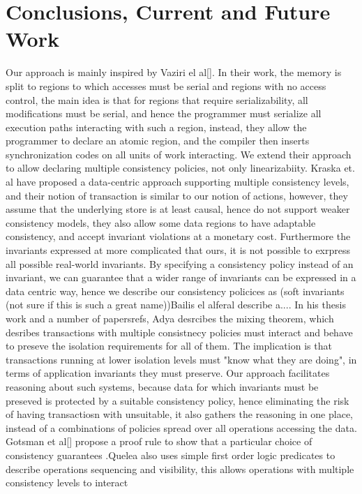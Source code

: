 \documentclass[preprint,numbers]{sigplanconf}
\begin{document}
\section{Conclusions, Current and Future Work}
Our approach is mainly inspired by Vaziri el al[]. In their work, the memory is
split to regions to which accesses must be serial and regions with no access
control, the main idea is that for regions that require serializability, all
modifications must be serial, and hence the programmer must serialize all
execution paths interacting with such a region, instead, they allow the
programmer to declare an atomic region, and the compiler then inserts
synchronization codes on all units of work interacting. 
We extend their approach to allow declaring multiple consistency
policies, not only linearizabiity. Kraska et. al have proposed a data-centric
approach supporting multiple consistency levels, and their notion of transaction
is similar to our notion of actions, however, they assume that the
underlying store is at least causal, hence do not support weaker consistency
models, they also allow some data regions to have adaptable consistency, and
accept invariant violations at a monetary cost. Furthermore the invariants
expressed at more complicated that ours, it is not possible to exrpress all
possible real-world invariants. By specifying a consistency policy instead of an
invariant, we can guarantee that a wider range of invariants can be expressed in
a data centric way, hence we describe our consistency policices as (soft
invariants (not sure if this is such a great name))Bailis el al{feral} describe
a.... In his thesis work and a number of papers{refs}, Adya desrcibes the mixing
theorem, which desribes  transactions with multiple consistnecy
policies must interact and behave to preseve the isolation requirements for all
of them. The implication is that transactions running at lower isolation levels
must "know what they are doing", in terms of application invariants they must
preserve. Our approach facilitates reasoning about such systems, because data
for which invariants must be preseved is protected by a suitable consistency
policy, hence eliminating the risk of having transactiosn with unsuitable, it
also gathers the reasoning in one place, instead of a combinations of policies
spread over all operations accessing the data. Gotsman et al[] propose a proof
rule to show that a particular choice of consistency guarantees  .Quelea also
uses simple first order logic predicates to describe operations sequencing and
visibility, this allows operations with multiple consistency levels to interact
\end{document}
